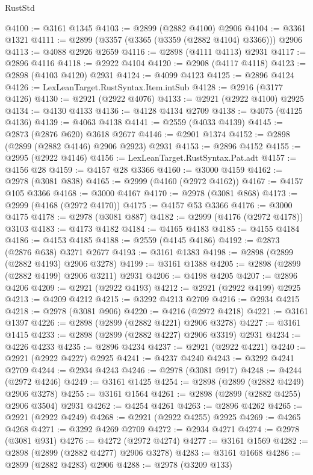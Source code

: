 \begin{lexlean}{RustStd}
\begin{coremodule}
@4100 := @3161 @1345
@4103 := @2899 (@2882 @4100) @2906
@4104 := @3361 @1321
@4111 := @2899 (@3357 (@3365 (@3359 (@2882 @4104) @3366))) @2906
@4113 := @4088 @2926 @2659
@4116 := @2898 (@4111 @4113) @2931
@4117 := @2896 @4116
@4118 := @2922 @4104
@4120 := @2908 (@4117 @4118)
@4123 := @2898 (@4103 @4120) @2931
@4124 := @4099 @4123
@4125 := @2896 @4124
@4126 := LexLeanTarget.RustSyntax.Item.intSub
@4128 := @2916 (@3177 @4126)
@4130 := @2921 (@2922 @4076)
@4133 := @2921 (@2922 @4100) @2925
@4134 := @4130 @4133
@4136 := @4128 @4134 @2709
@4138 := @4075 (@4125 @4136)
@4139 := @4063 @4138
@4141 := @2559 (@4033 @4139)
@4145 := @2873 (@2876 @620) @3618 @2677
@4146 := @2901 @1374
@4152 := @2898 (@2899 (@2882 @4146) @2906 @2923) @2931
@4153 := @2896 @4152
@4155 := @2995 (@2922 @4146)
@4156 := LexLeanTarget.RustSyntax.Pat.adt
@4157 := @4156 @28
@4159 := @4157 @28 @3366
@4160 := @3000 @4159
@4162 := @2978 (@3081 @838)
@4165 := @2999 (@4160 (@2972 @4162))
@4167 := @4157 @105 @3366
@4168 := @3000 @4167
@4170 := @2978 (@3081 @868)
@4173 := @2999 (@4168 (@2972 @4170))
@4175 := @4157 @53 @3366
@4176 := @3000 @4175
@4178 := @2978 (@3081 @887)
@4182 := @2999 (@4176 (@2972 @4178)) @3103
@4183 := @4173 @4182
@4184 := @4165 @4183
@4185 := @4155 @4184
@4186 := @4153 @4185
@4188 := @2559 (@4145 @4186)
@4192 := @2873 (@2876 @638) @3271 @2677
@4193 := @3161 @1383
@4198 := @2898 (@2899 (@2882 @4193) @2906 @3278)
@4199 := @3161 @1388
@4205 := @2898 (@2899 (@2882 @4199) @2906 @3211) @2931
@4206 := @4198 @4205
@4207 := @2896 @4206
@4209 := @2921 (@2922 @4193)
@4212 := @2921 (@2922 @4199) @2925
@4213 := @4209 @4212
@4215 := @3292 @4213 @2709
@4216 := @2934 @4215
@4218 := @2978 (@3081 @906)
@4220 := @4216 (@2972 @4218)
@4221 := @3161 @1397
@4226 := @2898 (@2899 (@2882 @4221) @2906 @3278)
@4227 := @3161 @1415
@4233 := @2898 (@2899 (@2882 @4227) @2906 @3319) @2931
@4234 := @4226 @4233
@4235 := @2896 @4234
@4237 := @2921 (@2922 @4221)
@4240 := @2921 (@2922 @4227) @2925
@4241 := @4237 @4240
@4243 := @3292 @4241 @2709
@4244 := @2934 @4243
@4246 := @2978 (@3081 @917)
@4248 := @4244 (@2972 @4246)
@4249 := @3161 @1425
@4254 := @2898 (@2899 (@2882 @4249) @2906 @3278)
@4255 := @3161 @1564
@4261 := @2898 (@2899 (@2882 @4255) @2906 @3504) @2931
@4262 := @4254 @4261
@4263 := @2896 @4262
@4265 := @2921 (@2922 @4249)
@4268 := @2921 (@2922 @4255) @2925
@4269 := @4265 @4268
@4271 := @3292 @4269 @2709
@4272 := @2934 @4271
@4274 := @2978 (@3081 @931)
@4276 := @4272 (@2972 @4274)
@4277 := @3161 @1569
@4282 := @2898 (@2899 (@2882 @4277) @2906 @3278)
@4283 := @3161 @1668
@4286 := @2899 (@2882 @4283) @2906
@4288 := @2978 (@3209 @133)

\end{coremodule}
\end{lexlean}
